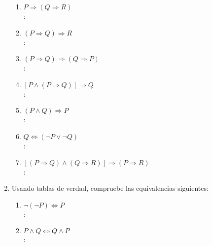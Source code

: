 \begin{enumerate}[label=0.1.\arabic*]
\begin{enumerate}[label=\arabic*)]
		\item $ P \Rightarrow (Q \Rightarrow R) $ \\
		\solucion: \\
		
		\item $ (P \Rightarrow Q) \Rightarrow R $ \\
		\solucion: \\
		
		\item $ (P \Rightarrow Q) \Rightarrow (Q \Rightarrow P) $ \\
		\solucion: \\
		
		\item $ [P \wedge (P \Rightarrow Q)] \Rightarrow Q $ \\
		\solucion: \\
		
		\item $ (P \wedge Q) \Rightarrow P $ \\
		\solucion: \\
		
		\item $ Q \Leftrightarrow (\neg P \vee \neg Q) $ \\
		\solucion: \\
		
		\item $ [(P \Rightarrow Q) \wedge (Q \Rightarrow R)] \Rightarrow (P \Rightarrow R) $ \\
		\solucion: \\
		
	\end{enumerate}
	
	\item Usando tablas de verdad, compruebe las equivalencias siguientes:
	\begin{enumerate}[label=\arabic*)]
		\item $ \neg (\neg P) \Leftrightarrow P $ \\
		\solucion: \\
		
		\item $ P \wedge Q \Leftrightarrow Q \wedge P $ \\
		\solucion: \\
		

\end{enumerate}
\end{enumerate}
